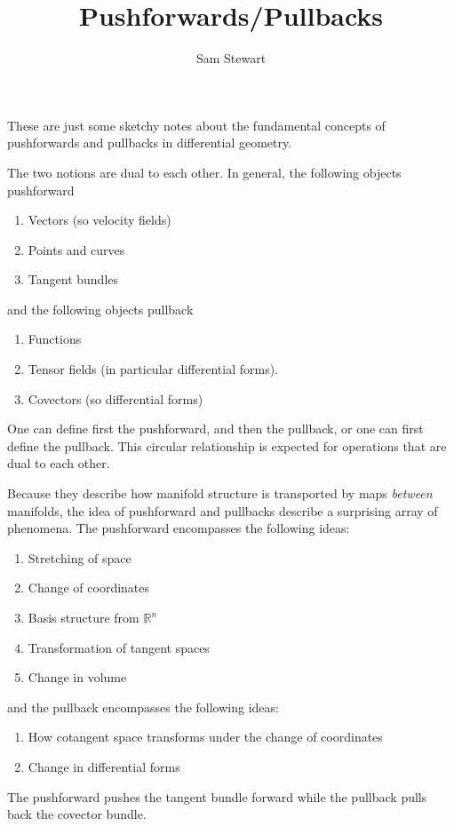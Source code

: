 \documentclass[12pt,letterpaper,boxed]{article}
\author{Sam Stewart}
\title{Pushforwards/Pullbacks}
\newcommand{\R}{{\mathbb{R}}}
\begin{document}
These are just some sketchy notes about the fundamental concepts of pushforwards and pullbacks in differential geometry.

The two notions are dual to each other. In general, the following objects pushforward
\begin{enumerate}
	\item Vectors (so velocity fields)
	\item Points and curves 
	\item Tangent bundles
\end{enumerate}
and the following objects pullback
\begin{enumerate}
	\item Functions
	\item Tensor fields (in particular differential forms).
	\item Covectors (so differential forms)
\end{enumerate}
One can define first the pushforward, and then the pullback, or one can first define the pullback. This circular relationship is expected for operations that are dual to each other.

Because they describe how manifold structure is transported by maps \textit{between} manifolds, the idea of pushforward and pullbacks describe a surprising array of phenomena. The pushforward encompasses the following ideas:
\begin{enumerate}
	\item Stretching of space
	\item Change of coordinates
	\item Basis structure from $\R^n$
	\item Transformation of tangent spaces
	\item Change in volume
\end{enumerate}

and the pullback encompasses the following ideas:
\begin{enumerate}
	\item How cotangent space transforms under the change of coordinates
	\item Change in differential forms
\end{enumerate}

The pushforward pushes the tangent bundle forward while the pullback pulls back the covector bundle.
\end{document}
